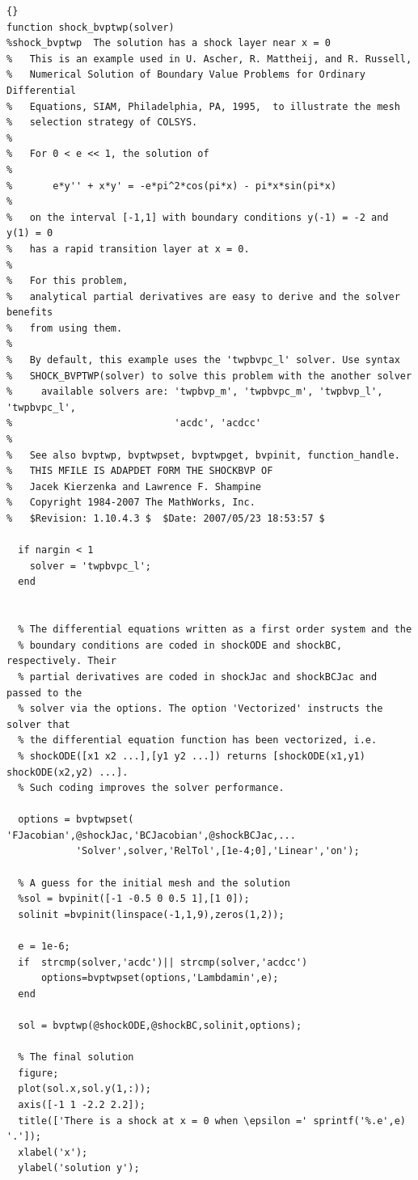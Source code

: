\documentclass{article}
\begin{document}
\begin{lstlisting}[fontadjust]{}
function shock_bvptwp(solver)
%shock_bvptwp  The solution has a shock layer near x = 0
%   This is an example used in U. Ascher, R. Mattheij, and R. Russell,
%   Numerical Solution of Boundary Value Problems for Ordinary Differential
%   Equations, SIAM, Philadelphia, PA, 1995,  to illustrate the mesh
%   selection strategy of COLSYS. 
%
%   For 0 < e << 1, the solution of 
%
%       e*y'' + x*y' = -e*pi^2*cos(pi*x) - pi*x*sin(pi*x)
%
%   on the interval [-1,1] with boundary conditions y(-1) = -2 and y(1) = 0
%   has a rapid transition layer at x = 0.
%
%   For this problem,
%   analytical partial derivatives are easy to derive and the solver benefits
%   from using them.  
%
%   By default, this example uses the 'twpbvpc_l' solver. Use syntax 
%   SHOCK_BVPTWP(solver) to solve this problem with the another solver
%     available solvers are: 'twpbvp_m', 'twpbvpc_m', 'twpbvp_l', 'twpbvpc_l',
%                            'acdc', 'acdcc'
%
%   See also bvptwp, bvptwpset, bvptwpget, bvpinit, function_handle.
%   THIS MFILE IS ADAPDET FORM THE SHOCKBVP OF
%   Jacek Kierzenka and Lawrence F. Shampine
%   Copyright 1984-2007 The MathWorks, Inc.
%   $Revision: 1.10.4.3 $  $Date: 2007/05/23 18:53:57 $

  if nargin < 1
    solver = 'twpbvpc_l';
  end


  % The differential equations written as a first order system and the
  % boundary conditions are coded in shockODE and shockBC, respectively. Their
  % partial derivatives are coded in shockJac and shockBCJac and passed to the
  % solver via the options. The option 'Vectorized' instructs the solver that
  % the differential equation function has been vectorized, i.e.
  % shockODE([x1 x2 ...],[y1 y2 ...]) returns [shockODE(x1,y1) shockODE(x2,y2) ...].
  % Such coding improves the solver performance.

  options = bvptwpset(	'FJacobian',@shockJac,'BCJacobian',@shockBCJac,...
			'Solver',solver,'RelTol',[1e-4;0],'Linear','on');

  % A guess for the initial mesh and the solution
  %sol = bvpinit([-1 -0.5 0 0.5 1],[1 0]);
  solinit =bvpinit(linspace(-1,1,9),zeros(1,2));

  e = 1e-6;
  if  strcmp(solver,'acdc')|| strcmp(solver,'acdcc')
      options=bvptwpset(options,'Lambdamin',e);
  end

  sol = bvptwp(@shockODE,@shockBC,solinit,options);

  % The final solution
  figure;
  plot(sol.x,sol.y(1,:));
  axis([-1 1 -2.2 2.2]);
  title(['There is a shock at x = 0 when \epsilon =' sprintf('%.e',e) '.']);
  xlabel('x');
  ylabel('solution y');


\end{lstlisting}
\end{document}

